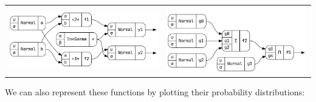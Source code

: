 \documentclass[landscape,a0b,final,a4resizeable]{a0poster}
\newenvironment{poster}{
\begin{center}
\begin{minipage}[c]{0.96\textwidth}
}{
\end{minipage}
\end{center}
}
\theoremstyle{definition}
\theoremstyle{remark}
\begin{document}
\begin{poster}
\begin{multicols}{3}
\begin{tabular}{cc}
\begin{minipage}[c]{0.5\columnwidth}
\centering
\includegraphics[width=\columnwidth]{bayesLR.png}
\end{minipage}
&
\begin{minipage}[c]{0.5\columnwidth}
\centering
\includegraphics[width=\columnwidth]{bayesR.png}
\end{minipage}
\end{tabular}

\vspace{\baselineskip}

We can also represent these functions by plotting their probability distributions:

\vspace{\baselineskip}


\end{multicols}
\end{poster}
\end{document}
